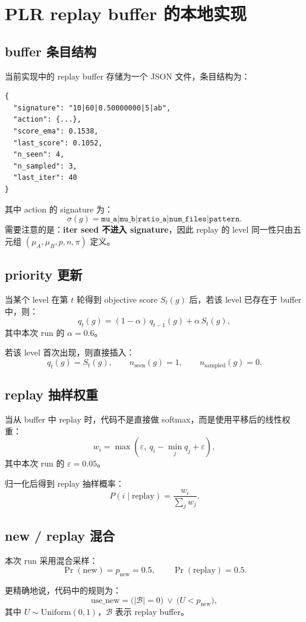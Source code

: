 \documentclass[11pt,a4paper]{ctexart}
\begin{document}
\section{PLR replay buffer 的本地实现}

\subsection{buffer 条目结构}
当前实现中的 replay buffer 存储为一个 JSON 文件，条目结构为：
\begin{lstlisting}
{
  "signature": "10|60|0.50000000|5|ab",
  "action": {...},
  "score_ema": 0.1538,
  "last_score": 0.1052,
  "n_seen": 4,
  "n_sampled": 3,
  "last_iter": 40
}
\end{lstlisting}

其中 action 的 signature 为：
\[
\sigma(g)=\texttt{mu\_a}|\texttt{mu\_b}|\texttt{ratio\_a}|\texttt{num\_files}|\texttt{pattern}.
\]
需要注意的是：\textbf{iter seed 不进入 signature}，因此 replay 的 level 同一性只由五元组 \((\mu_A,\mu_B,p,n,\pi)\) 定义。

\subsection{priority 更新}
当某个 level 在第 \(t\) 轮得到 objective score \(S_t(g)\) 后，若该 level 已存在于 buffer 中，则：
\[
q_t(g) = (1-\alpha)\,q_{t-1}(g)+\alpha\,S_t(g),
\]
其中本次 run 的 \(\alpha = 0.6\)。

若该 level 首次出现，则直接插入：
\[
q_t(g)=S_t(g),\qquad n_{\text{seen}}(g)=1,\qquad n_{\text{sampled}}(g)=0.
\]

\subsection{replay 抽样权重}
当从 buffer 中 replay 时，代码不是直接做 softmax，而是使用平移后的线性权重：
\[
w_i = \max(\varepsilon,\ q_i-\min_j q_j + \varepsilon),
\]
其中本次 run 的 \(\varepsilon = 0.05\)。

归一化后得到 replay 抽样概率：
\[
P(i\mid \text{replay})=\frac{w_i}{\sum_j w_j}.
\]

\subsection{new / replay 混合}
本次 run 采用混合采样：
\[
\Pr(\text{new}) = p_{\text{new}} = 0.5,\qquad \Pr(\text{replay})=0.5.
\]

更精确地说，代码中的规则为：
\[
\text{use\_new} = \big(|\mathcal{B}|=0\big)\ \lor\ \big(U < p_{\text{new}}\big),
\]
其中 \(U\sim\mathrm{Uniform}(0,1)\)，\(\mathcal{B}\) 表示 replay buffer。
\end{document}
